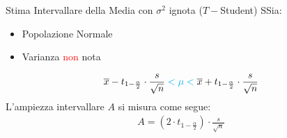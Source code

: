 \documentclass{article}  %
\theoremstyle{definition}
\begin{document}
\begin{theorem}{Stima Intervallare della Media con $\sigma^2$ ignota ($T-$Student)}
	SSia:
	\begin{itemize}
		\item Popolazione Normale
		\item Varianza \textcolor{red}{non} nota
	\end{itemize}
	\begin{align*}
		\overline{x}-t_{1-\frac{\alpha}{2}}\cdot \frac{s}{\sqrt{n}} \textcolor{cyan}{\; < \mu < \;} \overline{x}+t_{1-\frac{\alpha}{2}}\cdot \frac{s}{\sqrt{n}}
	\end{align*}
	L'ampiezza intervallare $A$ si misura come segue:
	\begin{align*}
		A = \left(2\cdot t_{1-\frac{\alpha}{2}}\right) \cdot \frac{s}{\sqrt{n}}
	\end{align*}
\end{theorem}
\end{document}

